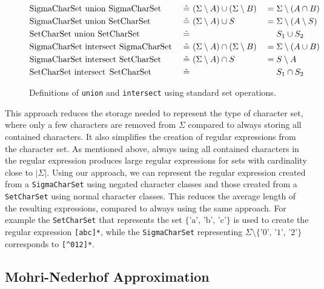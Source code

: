 \begin{figure}
\noindent
\begin{alignat*}{3}
	& \text{\lstinline|SigmaCharSet union SigmaCharSet| } && \hat{=}\ (\Sigma \setminus A) \cup (\Sigma \setminus B) & &= \Sigma \setminus (A \cap B) \\
	& \text{\lstinline|SigmaCharSet union SetCharSet| } && \hat{=}\ (\Sigma \setminus A) \cup S & &= \Sigma \setminus (A \setminus S) \\
	& \text{\lstinline|SetCharSet union SetCharSet| } && \hat{=}\ & &\phantom{{}={}} S_1 \cup S_2 \\
	& \text{\lstinline|SigmaCharSet intersect SigmaCharSet| } && \hat{=}\ (\Sigma \setminus A) \cap (\Sigma \setminus B) & &= \Sigma \setminus (A \cup B) \\
	& \text{\lstinline|SigmaCharSet intersect SetCharSet| } && \hat{=}\ (\Sigma \setminus A) \cap S & &= S \setminus A \\
	& \text{\lstinline|SetCharSet intersect SetCharSet| } && \hat{=}\ & &\phantom{{}={}} S_1 \cap S_2
\end{alignat*}
\caption{Definitions of \lstinline|union| and \lstinline|intersect| using standard set operations.}
\label{fig:setops}
\end{figure}

This approach reduces the storage needed to represent the type of character set, where only a few characters are removed from $\Sigma$ compared to always storing all contained characters. It also simplifies the creation of regular expressions from the character set. As mentioned above, always using all contained characters in the regular expression produces large regular expressions for sets with cardinality close to $|\Sigma|$. Using our approach, we can represent the regular expression created from a \lstinline|SigmaCharSet| using negated character classes and those created from a \lstinline|SetCharSet| using normal character classes. This reduces the average length of the resulting expressions, compared to always using the same approach.
For example the \lstinline|SetCharSet| that represents the set $\{\text{'a', 'b', 'c'}\}$ is used to create the regular expression \lstinline|[abc]*|, while the \lstinline|SigmaCharSet| representing $\Sigma \setminus \{\text{'0', '1', '2'}\}$ corresponds to \lstinline|[^012]*|.

		
\subsection{Mohri-Nederhof Approximation}\label{sec:mohriNederhofApprox}



